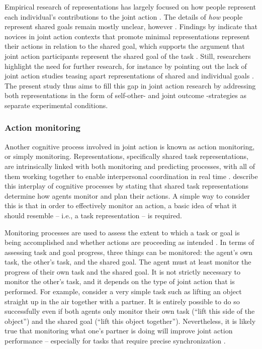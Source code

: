 \documentclass[10pt,a4paper,onecolumn]{article}
\begin{document}
Empirical research of representations has largely focused on how people represent each individual's contributions to the joint action \autocite{knoblichPsychologicalResearchJoint2011,loehrSoundYouMe2016}. The details of \emph{how} people represent shared goals remain mostly unclear, however \autocite{loehrSoundYouMe2016}. Findings by \textcite{loehrSoundYouMe2016} indicate that novices in joint action contexts that promote minimal representations represent their actions in relation to the shared goal, which supports the argument that joint action participants represent the shared goal of the task \autocite{vesperMinimalArchitectureJoint2010}. Still, researchers highlight the need for further research, for instance by pointing out the lack of joint action studies teasing apart representations of shared and individual goals \autocite{loehrSoundYouMe2016}. The present study thus aims to fill this gap in joint action research by addressing both representations in the form of self-other- and joint outcome -strategies as separate experimental conditions.

\hypertarget{action-monitoring}{%
\subsubsection{Action monitoring}\label{action-monitoring}}

Another cognitive process involved in joint action is known as action monitoring, or simply monitoring. Representations, specifically shared task representations, are intrinsically linked with both monitoring and predicting processes, with all of them working together to enable interpersonal coordination in real time \autocite{knoblichPsychologicalResearchJoint2011}. \textcite{knoblichPsychologicalResearchJoint2011} describe this interplay of cognitive processes by stating that shared task representations determine how agents monitor and plan their actions. A simple way to consider this is that in order to effectively monitor an action, a basic idea of what it should resemble -- i.e., a task representation -- is required.

Monitoring processes are used to assess the extent to which a task or goal is being accomplished and whether actions are proceeding as intended \autocite{botvinickConflictMonitoringCognitive2001}. In terms of assessing task and goal progress, three things can be monitored: the agent's own task, the other's task, and the shared goal. The agent must at least monitor the progress of their own task and the shared goal. It is not strictly necessary to monitor the other's task, and it depends on the type of joint action that is performed. For example, consider a very simple task such as lifting an object straight up in the air together with a partner. It is entirely possible to do so successfully even if both agents only monitor their own task (``lift this side of the object'') and the shared goal (``lift this object together''). Nevertheless, it is likely true that monitoring what one's partner is doing will improve joint action performance -- especially for tasks that require precise synchronization \autocite{vesperMinimalArchitectureJoint2010}.
\end{document}
